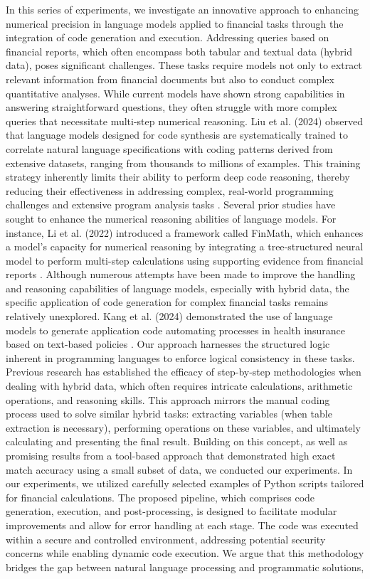 \documentclass[logo,msc]{infthesis}           %
\begin{document}
In this series of experiments, we investigate an innovative approach to enhancing numerical precision in language models applied to financial tasks through the integration of code generation and execution. Addressing queries based on financial reports, which often encompass both tabular and textual data (hybrid data), poses significant challenges. These tasks require models not only to extract relevant information from financial documents but also to conduct complex quantitative analyses. While current models have shown strong capabilities in answering straightforward questions, they often struggle with more complex queries that necessitate multi-step numerical reasoning. Liu et al. (2024) observed that language models designed for code synthesis are systematically trained to correlate natural language specifications with coding patterns derived from extensive datasets, ranging from thousands to millions of examples. This training strategy inherently limits their ability to perform deep code reasoning, thereby reducing their effectiveness in addressing complex, real-world programming challenges and extensive program analysis tasks \cite{liu2024codemindframeworkchallengelarge}. Several prior studies have sought to enhance the numerical reasoning abilities of language models. For instance, Li et al. (2022) introduced a framework called FinMath, which enhances a model's capacity for numerical reasoning by integrating a tree-structured neural model to perform multi-step calculations using supporting evidence from financial reports \cite{li-etal-2022-finmath}. Although numerous attempts have been made to improve the handling and reasoning capabilities of language models, especially with hybrid data, the specific application of code generation for complex financial tasks remains relatively unexplored. Kang et al. (2024) demonstrated the use of language models to generate application code automating processes in health insurance based on text-based policies \cite{kang2024usinglargelanguagemodels}. Our approach harnesses the structured logic inherent in programming languages to enforce logical consistency in these tasks. Previous research has established the efficacy of step-by-step methodologies when dealing with hybrid data, which often requires intricate calculations, arithmetic operations, and reasoning skills. This approach mirrors the manual coding process used to solve similar hybrid tasks: extracting variables (when table extraction is necessary), performing operations on these variables, and ultimately calculating and presenting the final result. Building on this concept, as well as promising results from a tool-based approach that demonstrated high exact match accuracy using a small subset of data, we conducted our experiments. In our experiments, we utilized carefully selected examples of Python scripts tailored for financial calculations. The proposed pipeline, which comprises code generation, execution, and post-processing, is designed to facilitate modular improvements and allow for error handling at each stage. The code was executed within a secure and controlled environment, addressing potential security concerns while enabling dynamic code execution. We argue that this methodology bridges the gap between natural language processing and programmatic solutions, 
\end{document}
